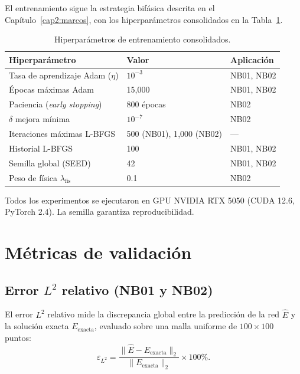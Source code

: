 El entrenamiento sigue la estrategia bifásica descrita en el
Capítulo~\ref{cap2:marcos}, con los hiperparámetros consolidados en la
Tabla~\ref{tab:hiperparametros}.

\begin{table}[htbp]
\centering
\begin{threeparttable}
\caption{Hiperparámetros de entrenamiento consolidados.}
\label{tab:hiperparametros}
\begin{tabular}{lll}
\toprule
Hiperparámetro & Valor & Aplicación \\
\midrule
Tasa de aprendizaje Adam ($\eta$) & $10^{-3}$ & NB01, NB02 \\
Épocas máximas Adam             & 15{,}000  & NB01, NB02 \\
Paciencia (\textit{early stopping}) & 800 épocas & NB02 \\
$\delta$ mejora mínima          & $10^{-7}$ & NB02 \\
Iteraciones máximas L-BFGS      & 500 (NB01), 1{,}000 (NB02) & — \\
Historial L-BFGS                & 100       & NB01, NB02 \\
Semilla global (SEED)           & 42        & NB01, NB02 \\
Peso de física $\lambda_\text{fís}$ & 0.1  & NB02 \\
\bottomrule
\end{tabular}
\begin{tablenotes}\small
    \item Todos los experimentos se ejecutaron en GPU NVIDIA RTX 5050
    (CUDA 12.6, PyTorch 2.4). La semilla garantiza reproducibilidad.
\end{tablenotes}
\end{threeparttable}
\end{table}

\section{Métricas de validación}

\subsection{Error $L^2$ relativo (NB01 y NB02)}

El error $L^2$ relativo mide la discrepancia global entre la predicción de la
red $\hat{E}$ y la solución exacta $E_\text{exacta}$, evaluado sobre una malla
uniforme de $100 \times 100$ puntos:
%
\begin{equation}
    \varepsilon_{L^2} = \frac{\|\hat{E} - E_\text{exacta}\|_2}
    {\|E_\text{exacta}\|_2} \times 100\%.
    \label{eq:l2}
\end{equation}


